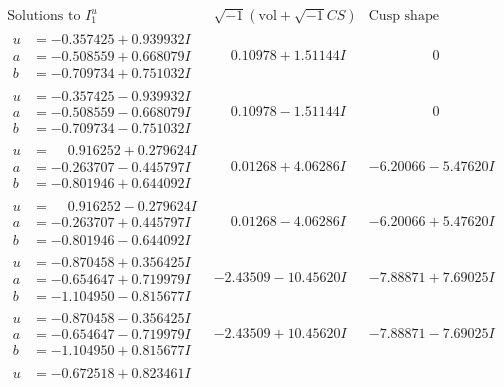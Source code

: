 \documentclass[1p]{elsarticle_modified}
\theoremstyle{definition}
\newcommand{\I}{\sqrt{-1}}
\begin{document}
$$\begin{array}{c|c|c}  
\text{Solutions to }I^u_{1}& \I (\text{vol} + \sqrt{-1}CS) & \text{Cusp shape}\\
 \hline 
\begin{aligned}
u &= -0.357425 + 0.939932 I \\
a &= -0.508559 + 0.668079 I \\
b &= -0.709734 + 0.751032 I\end{aligned}
 & \phantom{-}0.10978 + 1.51144 I & \phantom{-0.000000 } 0 \\ \hline\begin{aligned}
u &= -0.357425 - 0.939932 I \\
a &= -0.508559 - 0.668079 I \\
b &= -0.709734 - 0.751032 I\end{aligned}
 & \phantom{-}0.10978 - 1.51144 I & \phantom{-0.000000 } 0 \\ \hline\begin{aligned}
u &= \phantom{-}0.916252 + 0.279624 I \\
a &= -0.263707 - 0.445797 I \\
b &= -0.801946 + 0.644092 I\end{aligned}
 & \phantom{-}0.01268 + 4.06286 I & -6.20066 - 5.47620 I \\ \hline\begin{aligned}
u &= \phantom{-}0.916252 - 0.279624 I \\
a &= -0.263707 + 0.445797 I \\
b &= -0.801946 - 0.644092 I\end{aligned}
 & \phantom{-}0.01268 - 4.06286 I & -6.20066 + 5.47620 I \\ \hline\begin{aligned}
u &= -0.870458 + 0.356425 I \\
a &= -0.654647 + 0.719979 I \\
b &= -1.104950 - 0.815677 I\end{aligned}
 & -2.43509 - 10.45620 I & -7.88871 + 7.69025 I \\ \hline\begin{aligned}
u &= -0.870458 - 0.356425 I \\
a &= -0.654647 - 0.719979 I \\
b &= -1.104950 + 0.815677 I\end{aligned}
 & -2.43509 + 10.45620 I & -7.88871 - 7.69025 I \\ \hline\begin{aligned}
u &= -0.672518 + 0.823461 I \\

\end{aligned}
\end{array}$$
\end{document}
